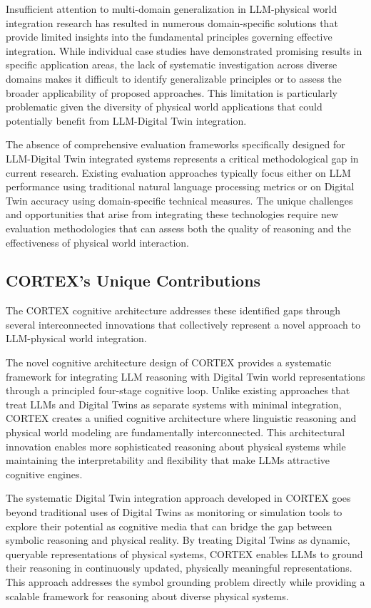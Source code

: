 Insufficient attention to multi-domain generalization in LLM-physical world integration research has resulted in numerous domain-specific solutions that provide limited insights into the fundamental principles governing effective integration. While individual case studies have demonstrated promising results in specific application areas, the lack of systematic investigation across diverse domains makes it difficult to identify generalizable principles or to assess the broader applicability of proposed approaches. This limitation is particularly problematic given the diversity of physical world applications that could potentially benefit from LLM-Digital Twin integration.

The absence of comprehensive evaluation frameworks specifically designed for LLM-Digital Twin integrated systems represents a critical methodological gap in current research. Existing evaluation approaches typically focus either on LLM performance using traditional natural language processing metrics or on Digital Twin accuracy using domain-specific technical measures. The unique challenges and opportunities that arise from integrating these technologies require new evaluation methodologies that can assess both the quality of reasoning and the effectiveness of physical world interaction.

\subsection{CORTEX's Unique Contributions}

The CORTEX cognitive architecture addresses these identified gaps through several interconnected innovations that collectively represent a novel approach to LLM-physical world integration.

The novel cognitive architecture design of CORTEX provides a systematic framework for integrating LLM reasoning with Digital Twin world representations through a principled four-stage cognitive loop. Unlike existing approaches that treat LLMs and Digital Twins as separate systems with minimal integration, CORTEX creates a unified cognitive architecture where linguistic reasoning and physical world modeling are fundamentally interconnected. This architectural innovation enables more sophisticated reasoning about physical systems while maintaining the interpretability and flexibility that make LLMs attractive cognitive engines.

The systematic Digital Twin integration approach developed in CORTEX goes beyond traditional uses of Digital Twins as monitoring or simulation tools to explore their potential as cognitive media that can bridge the gap between symbolic reasoning and physical reality. By treating Digital Twins as dynamic, queryable representations of physical systems, CORTEX enables LLMs to ground their reasoning in continuously updated, physically meaningful representations. This approach addresses the symbol grounding problem directly while providing a scalable framework for reasoning about diverse physical systems.

